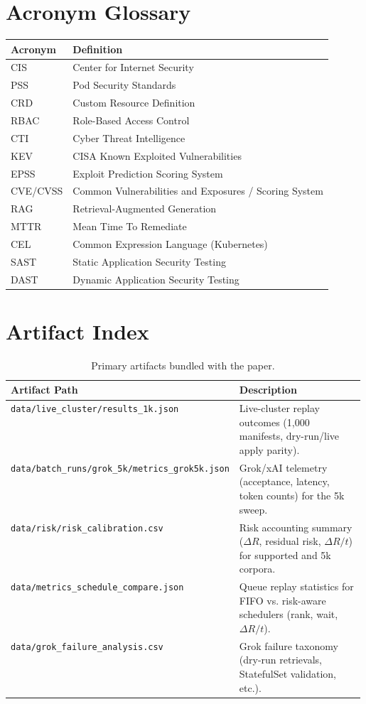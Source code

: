\documentclass[10pt]{article}
\begin{document}
\section{Acronym Glossary}
\label{app:acronyms}
\begin{table}[H]
\centering
\small
\begin{tabularx}{\linewidth}{@{}l X@{}}
\toprule
\textbf{Acronym} & \textbf{Definition} \\
\midrule
CIS & Center for Internet Security \\
PSS & Pod Security Standards \\
CRD & Custom Resource Definition \\
RBAC & Role-Based Access Control \\
CTI & Cyber Threat Intelligence \\
KEV & CISA Known Exploited Vulnerabilities \\
EPSS & Exploit Prediction Scoring System \\
CVE/CVSS & Common Vulnerabilities and Exposures / Scoring System \\
RAG & Retrieval-Augmented Generation \\
MTTR & Mean Time To Remediate \\
CEL & Common Expression Language (Kubernetes) \\
SAST & Static Application Security Testing \\
DAST & Dynamic Application Security Testing \\
\bottomrule
\end{tabularx}
\end{table}

\section{Artifact Index}
\label{app:artifact_index}
\begin{table}[H]
\centering
\small
\caption{Primary artifacts bundled with the paper.}
\label{tab:primary_artifacts}
\begin{tabularx}{\linewidth}{@{}>{\ttfamily\raggedright\arraybackslash}p{0.58\linewidth} X@{}}
\toprule
\textbf{Artifact Path} & \textbf{Description} \\
\midrule
\texttt{data/live\_cluster/results\_1k.json} & Live-cluster replay outcomes (1,000 manifests, dry-run/live apply parity). \\
\texttt{data/batch\_runs/grok\_5k/metrics\_grok5k.json} & Grok/xAI telemetry (acceptance, latency, token counts) for the 5k sweep. \\
\texttt{data/risk/risk\_calibration.csv} & Risk accounting summary ($\Delta R$, residual risk, $\Delta R/t$) for supported and 5k corpora. \\
\texttt{data/metrics\_schedule\_compare.json} & Queue replay statistics for FIFO vs. risk-aware schedulers (rank, wait, $\Delta R/t$). \\
\texttt{data/grok\_failure\_analysis.csv} & Grok failure taxonomy (dry-run retrievals, StatefulSet validation, etc.). \\
\bottomrule
\end{tabularx}
\end{table}
\end{document}
